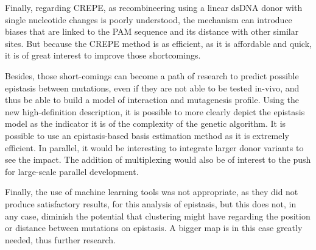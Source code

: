 \documentclass[12pt]{article}
\begin{document}
  Finally, regarding CREPE, as recombineering using a linear dsDNA donor with
  single nucleotide changes is poorly understood, the mechanism can introduce
  biases that are linked to the PAM sequence and its distance with other similar
  sites. But because the CREPE method is as efficient, as it is affordable and
  quick, it is of great interest to improve those shortcomings. 

  Besides, those short-comings can become a path of research to predict possible
  epistasis between mutations, even if they are not able to be tested in-vivo,
  and thus be able to build a model of interaction and mutagenesis profile. Using
  the new high-definition description, it is possible to more clearly depict the
  epistasis model as the indicator it is of the complexity of the genetic
  algorithm. It is possible to use an epistasis-based basis estimation method as
  it is extremely efficient. In parallel, it would be interesting to integrate
  larger donor variants to see the impact. The addition of multiplexing would
  also be of interest to the push for large-scale parallel development.  

  Finally, the use of machine learning tools was not appropriate, as they did not
  produce satisfactory results, for this analysis of epistasis, but this does
  not, in any case, diminish the potential that clustering might have regarding
  the position or distance between mutations on epistasis. A bigger map is in
  this case greatly needed, thus further research.


  \newpage

  
  
\end{document}
